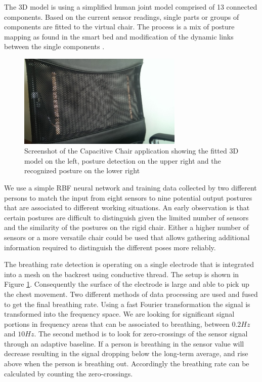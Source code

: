 The 3D model is using a simplified human joint model comprised of 13 connected components. Based on the current sensor readings, single parts or groups of components are fitted to the virtual chair. The process is a mix of posture mapping as found in the smart bed and modification of the dynamic links between the single components \cite{Braun2013ChairAid}.
\begin{figure}[h]
\centering
\includegraphics[width=0.7\textwidth]{images/smartchair_thread}
\caption{Screenshot of the Capacitive Chair application showing the fitted 3D model on the left, posture detection on the upper right and the recognized posture on the lower right}
\label{fig:smartchair_thread}
\end{figure}
We use a simple RBF neural network and training data collected by two different persons to match the input from eight sensors to nine potential output postures that are associated to different working situations. An early observation is that certain postures are difficult to distinguish given the limited number of sensors and the similarity of the postures on the rigid chair. Either a higher number of sensors or a more versatile chair could be used that allows gathering additional information required to distinguish the different poses more reliably. 

The breathing rate detection is operating on a single electrode that is integrated into a mesh on the backrest using conductive thread. The setup is shown in Figure \ref{fig:smartchair_thread}. Consequently the surface of the electrode is large and able to pick up the chest movement. Two different methods of data processing are used and fused to get the final breathing rate. Using a fast Fourier transformation the signal is transformed into the frequency space. We are looking for significant signal portions in frequency areas that can be associated to breathing, between $0.2Hz$ and $10Hz$. The second method is to look for zero-crossings of the sensor signal through an adaptive baseline. If a person is breathing in the sensor value will decrease resulting in the signal dropping below the long-term average, and rise above when the person is breathing out. Accordingly the breathing rate can be calculated by counting the zero-crossings.
